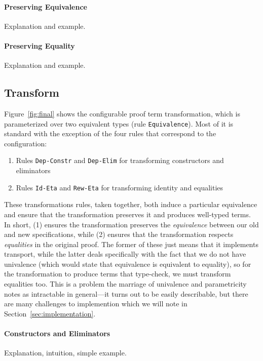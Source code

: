 \paragraph{Preserving Equivalence} Explanation and example.

\paragraph{Preserving Equality} Explanation and example.

\subsection{Transform}
\label{sec:transform}

Figure~\ref{fig:final} shows the configurable proof term transformation,
which is parameterized over two equivalent types (rule \lstinline{Equivalence}).
Most of it is standard with the exception of the four rules that correspond to the configuration:

\begin{enumerate}
\item Rules \lstinline{Dep-Constr} and \lstinline{Dep-Elim} for transforming constructors and eliminators 
\item Rules \lstinline{Id-Eta} and \lstinline{Rew-Eta} for transforming identity and equalities
\end{enumerate}
These transformations rules, taken together, both induce a particular equivalence and ensure that the transformation
preserves it and produces well-typed terms.
In short, (1) ensures the transformation preserves the \textit{equivalence} between our old and new specifications,
while (2) ensures that the transformation respects \textit{equalities} in the original proof.
The former of these just means that it implements transport, while the latter deals specifically
with the fact that we do not have univalence (which would state that equivalence is equivalent to equality),
so for the transformation to produce terms that type-check, we must transform equalities too.
This is a problem the marriage of univalence and parametricity notes as intractable in general---it turns out
to be easily describable, but there are many challenges to implemention which we will note in Section~\ref{sec:implementation}.

\paragraph{Constructors and Eliminators} Explanation, intuition, simple example.

